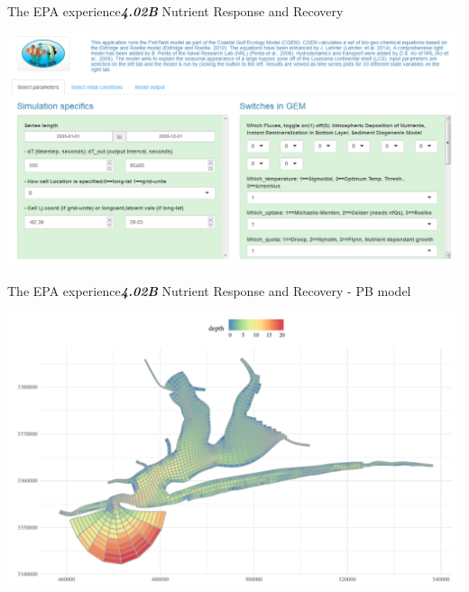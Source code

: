 \documentclass[serif]{beamer}\usepackage[]{graphicx}\usepackage[]{color}
\makeatletter
\def\maxwidth{ %
  \ifdim\Gin@nat@width>\linewidth
    \linewidth
  \else
    \Gin@nat@width
  \fi
}
\newcommand{\emtxt}[1]{\textbf{\textit{#1}}}
\makeatother
\begin{document}
\begin{frame}{The EPA experience}{\emtxt{4.02B} Nutrient Response and Recovery}
\centerline{\includegraphics[width = 1.05\textwidth]{fig/fishtank_gui.png}}
\end{frame}

\begin{frame}{The EPA experience}{\emtxt{4.02B} Nutrient Response and Recovery - PB model}


{\centering \includegraphics[width=\maxwidth]{fig/unnamed-chunk-4-1} 

}



\end{frame}
\end{document}
